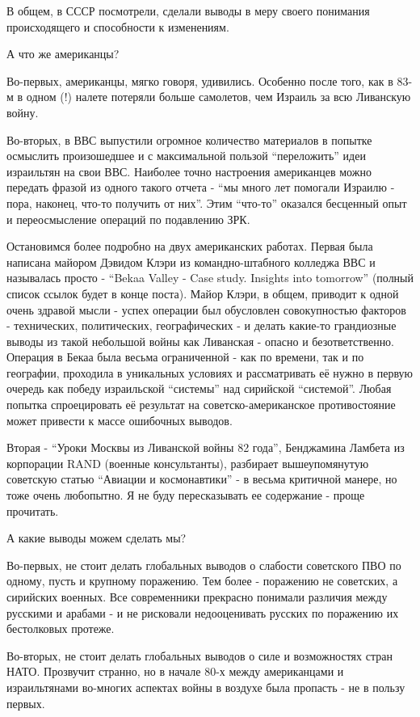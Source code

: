 В общем, в СССР посмотрели, сделали выводы в меру своего понимания происходящего и способности к изменениям.

А что же американцы?

Во-первых, американцы, мягко говоря, удивились. Особенно после того, как в 83-м в одном (!) налете потеряли больше самолетов, чем Израиль за всю Ливанскую войну.

Во-вторых, в ВВС выпустили огромное количество материалов в попытке осмыслить произошедшее и с максимальной пользой “переложить” идеи израильтян на свои ВВС. Наиболее точно настроения американцев можно передать фразой из одного такого отчета - “мы много лет помогали Израилю - пора, наконец, что-то получить от них”. Этим “что-то” оказался бесценный опыт и переосмысление операций по подавлению ЗРК.

Остановимся более подробно на двух американских работах.
Первая была написана майором Дэвидом Клэри из командно-штабного колледжа ВВС и называлась просто - “Bekaa Valley - Case study. Insights into tomorrow” (полный список ссылок будет в конце поста). Майор Клэри, в общем, приводит к одной очень здравой мысли - успех операции был обусловлен совокупностью факторов - технических, политических, географических - и делать какие-то грандиозные выводы из такой небольшой войны как Ливанская - опасно и безответственно. Операция в Бекаа была весьма ограниченной - как по времени, так и по географии, проходила в уникальных условиях и рассматривать её нужно в первую очередь как победу израильской “системы” над сирийской “системой”. Любая попытка спроецировать её результат на советско-американское противостояние может привести к массе ошибочных выводов.

Вторая - “Уроки Москвы из Ливанской войны 82 года”, Бенджамина Ламбета из корпорации RAND (военные консультанты), разбирает вышеупомянутую советскую статью “Авиации и космонавтики” - в весьма критичной манере, но тоже очень любопытно. Я не буду пересказывать ее содержание - проще прочитать.

А какие выводы можем сделать мы?

Во-первых, не стоит делать глобальных выводов о слабости советского ПВО по одному, пусть и крупному поражению. Тем более - поражению не советских, а сирийских военных. Все современники прекрасно понимали различия между русскими и арабами - и не рисковали недооценивать русских по поражению их бестолковых протеже.

Во-вторых, не стоит делать глобальных выводов о силе и возможностях стран НАТО. Прозвучит странно, но в начале 80-х между американцами и израильтянами во-многих аспектах войны в воздухе была пропасть - не в пользу первых.

